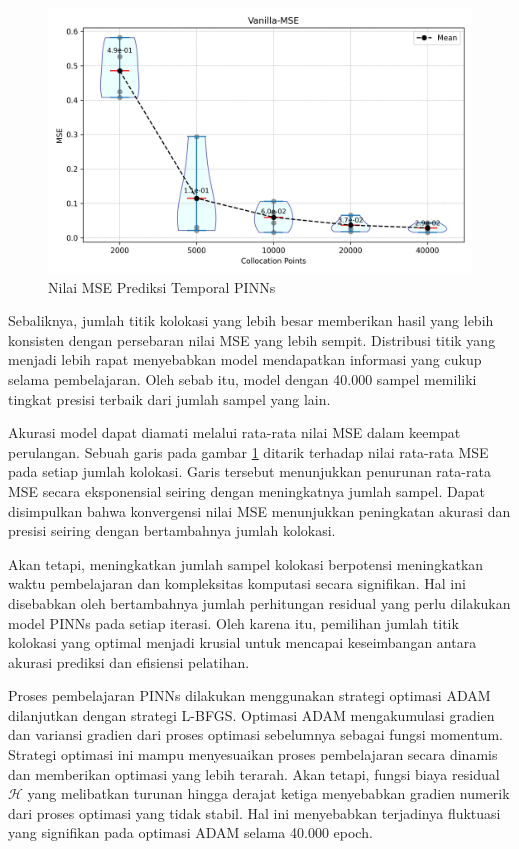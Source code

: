 \begin{figure}[htbp]
    \centering
    \includegraphics[width=0.9 \linewidth]{Gambar/colPoints-Error.png}
    \caption{Nilai MSE Prediksi Temporal PINNs}
    \label{fig:VPINN-MSE}
\end{figure} 

Sebaliknya, jumlah titik kolokasi yang lebih besar memberikan hasil yang lebih konsisten dengan persebaran nilai MSE yang lebih sempit. Distribusi titik yang menjadi lebih rapat menyebabkan model mendapatkan informasi yang cukup selama pembelajaran. Oleh sebab itu, model dengan 40.000 sampel memiliki tingkat presisi terbaik dari jumlah sampel yang lain. 

Akurasi model dapat diamati melalui rata-rata nilai MSE dalam keempat perulangan. Sebuah garis pada gambar \ref{fig:VPINN-MSE} ditarik terhadap nilai rata-rata MSE pada setiap jumlah kolokasi. Garis tersebut menunjukkan penurunan rata-rata MSE secara eksponensial seiring dengan meningkatnya jumlah sampel. Dapat disimpulkan bahwa konvergensi nilai MSE menunjukkan peningkatan akurasi dan presisi seiring dengan bertambahnya jumlah kolokasi.

Akan tetapi, meningkatkan jumlah sampel kolokasi berpotensi meningkatkan waktu pembelajaran dan kompleksitas komputasi secara signifikan. Hal ini disebabkan oleh bertambahnya jumlah perhitungan residual yang perlu dilakukan model PINNs pada setiap iterasi. Oleh karena itu, pemilihan jumlah titik kolokasi yang optimal menjadi krusial untuk mencapai keseimbangan antara akurasi prediksi dan efisiensi pelatihan.

Proses pembelajaran PINNs dilakukan menggunakan strategi optimasi ADAM dilanjutkan dengan strategi L-BFGS. Optimasi ADAM mengakumulasi gradien dan variansi gradien dari proses optimasi sebelumnya sebagai fungsi momentum. Strategi optimasi ini mampu menyesuaikan proses pembelajaran secara dinamis dan memberikan optimasi yang lebih terarah. Akan tetapi, fungsi biaya residual $\mathcal{H}$ yang melibatkan turunan hingga derajat ketiga menyebabkan gradien numerik dari proses optimasi yang tidak stabil. Hal ini menyebabkan terjadinya fluktuasi yang signifikan pada optimasi ADAM selama 40.000 epoch.

